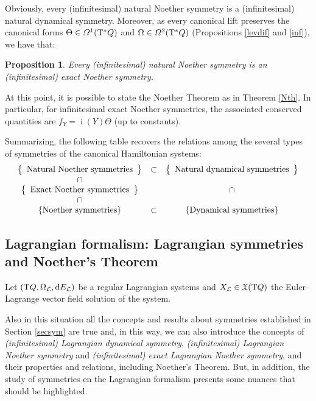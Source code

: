 \documentclass[12pt]{report}
\newtheorem{prop}[teor]{Proposition}
\def\vf{\mathfrak X}
\def\df{{\mit\Omega}}
\def\Lag{{\cal L}}
\def\d{{\rm d}}
\def\Tan{{\rm T}}
\def\inn{\mathop{i}\nolimits}
\begin{document}
Obviously, every (infinitesimal) natural  Noether symmetry  is a
(infinitesimal) natural  dynamical  symmetry.
Moreover, as every canonical lift preserves the canonical forms
$\Theta\in\df^1(\Tan^*Q)$ and $\Omega\in\df^2(\Tan^*Q)$
(Propositions \ref{levdif} and \ref{inf}), we have that:

\begin{prop}
Every (infinitesimal) natural Noether symmetry is an
(infinitesimal) exact  Noether symmetry.
\end{prop}

At this point, it is possible to state the Noether Theorem as in Theorem \ref{Nth}.
In particular, for infinitesimal exact Noether symmetries,
the associated conserved quantities are 
$f_Y=\inn(Y)\Theta$ (up to constants).

Summarizing, the following table recovers the relations among
the several types
of symmetries of the canonical Hamiltonian systems:
$$
\begin{array}{ccc}
\left\{ \begin{array}{c}
\mbox{\rm Natural Noether symmetries}
\end{array}\right\}
& \subset &
\left\{ \begin{array}{c}
\mbox{\rm Natural dynamical symmetries}
\end{array}\right\}
\\ \cap & &  \\
\left\{ \begin{array}{c}
\mbox{\rm Exact Noether symmetries}
\end{array}\right\}
&  & \cap
\\ \cap &  &  \\
\{ \mbox{\rm Noether symmetries}\}
& \subset &
\{ \mbox{\rm Dynamical symmetries} \}
\end{array}
$$


\subsection{Lagrangian formalism: Lagrangian symmetries and Noether's Theorem}


Let $(\Tan Q,\Omega_\Lag,\d E_\Lag)$ be a regular Lagrangian systems
and $X_\Lag\in\vf(\Tan Q)$ the Euler--Lagrange vector field solution of the system.

Also in this situation all the concepts and results about symmetries
established in Section \ref{secsym} are true and,
in this way, we can also introduce the concepts of
{\sl  (infinitesimal) Lagrangian dynamical symmetry},
{\sl  (infinitesimal) Lagrangian Noether symmetry}
and  {\sl (infinitesimal) exact  Lagrangian Noether symmetry},
and their properties and relations, including Noether's Theorem.
But, in addition, the study of symmetries en the Lagrangian formalism
presents some nuances that should be highlighted.
\end{document}
